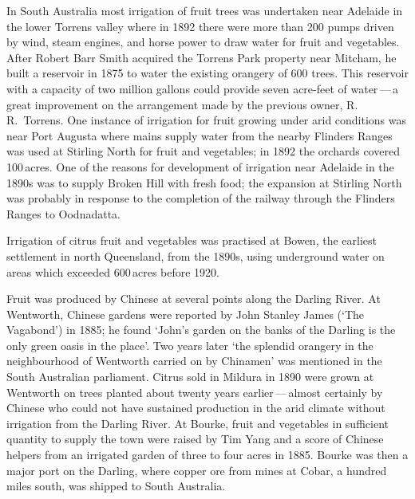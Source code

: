 In South Australia  most irrigation of fruit
trees was undertaken near Adelaide in the lower Torrens valley
 where in 1892 there were more than 200 pumps
driven by wind, steam engines, and horse power to draw water for fruit
and vegetables.  After Robert Barr Smith 
acquired the Torrens Park  property near Mitcham,
 he built a reservoir
 in
1875 to water the existing orangery of 600 trees.  This reservoir with
a capacity of two million gallons could provide seven acre-feet of
water\,---\,a great improvement on the arrangement made by the
previous owner, R.\,R.~Torrens.  One instance
of irrigation for fruit growing under arid conditions was near Port
Augusta  where mains supply water from the
nearby Flinders Ranges  was used at
Stirling North  for fruit and vegetables; in
1892 the orchards covered 100\,acres.  One of the reasons for
development of irrigation near Adelaide in the 1890s was to supply
Broken Hill
 with fresh food; the expansion at Stirling North
was probably in response to the completion of the railway through the
Flinders Ranges to Oodnadatta.

Irrigation of citrus fruit and vegetables was practised at Bowen,
 the earliest settlement in north Queensland, from the
1890s, using underground water on areas which exceeded 600\,acres
before 1920.

Fruit was produced by Chinese  at several points along
the Darling River.   At Wentworth,
 Chinese
gardens were reported by John Stanley James 
(`The Vagabond') in 1885; he found `John's garden on the banks of the
Darling is the only green oasis in the place'. Two years later `the
splendid orangery in the neighbourhood of Wentworth carried on by
Chinamen' was mentioned in the South Australian parliament.  Citrus
sold in Mildura  in 1890 were grown at Wentworth
on trees planted about twenty years earlier\,---\,almost certainly by
Chinese who could not have sustained production in the arid climate
without irrigation from the Darling River.  At
Bourke,  fruit and vegetables in sufficient
quantity to supply the town were raised by Tim Yang and a score of
Chinese helpers from an irrigated garden of three to four acres in
1885.  Bourke was then a major port on the Darling, where copper ore
from mines at Cobar,
 a hundred miles south, was shipped to South
Australia.

